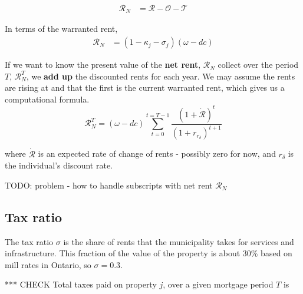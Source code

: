 \begin{align}
\mathcal{R}_N &= \mathcal{R} - \mathcal{O} - \mathcal{T} 
\end{align}

In terms of the warranted rent, 
\begin{align}
\mathcal{R}_N &= (1-\kappa_j - \sigma_j)(\omega - {dc}) %
\end{align}




If we want to know the  present value  of the \textbf{net rent}, $\mathcal{R}_N$  collect over the period  $T$, $\mathcal{R}_N^T$, we \textbf{add up} the discounted rents for each year. We may assume the rents are rising at and that the first is the current warranted rent, which gives us a computational formula. 
\[\mathcal{R}_N^T= (\omega-dc)\sum_{t=0}^{t=T-1} \frac{(1+\dot{\mathcal{R}})^{t}} {(1+r_{r_\delta})^{t+1}} \]

\noindent where $\dot{\mathcal{R}}$ is an expected rate of change of rents - possibly zero for now, and $r_\delta$ is the individual's discount rate. 

TODO: problem - how to handle subscripts with net rent $\mathcal{R}_N$


\subsection{Tax ratio}\label{SS:TaxRatio} 
The tax ratio $\sigma$ is the share of rents that the municipality takes for services and infrastructure. This fraction of the value of the property is about 30\% based on mill rates in Ontario,  so $\sigma = 0.3$. %

*** CHECK Total taxes paid on  property $j$, over a given mortgage period $T$ is 

